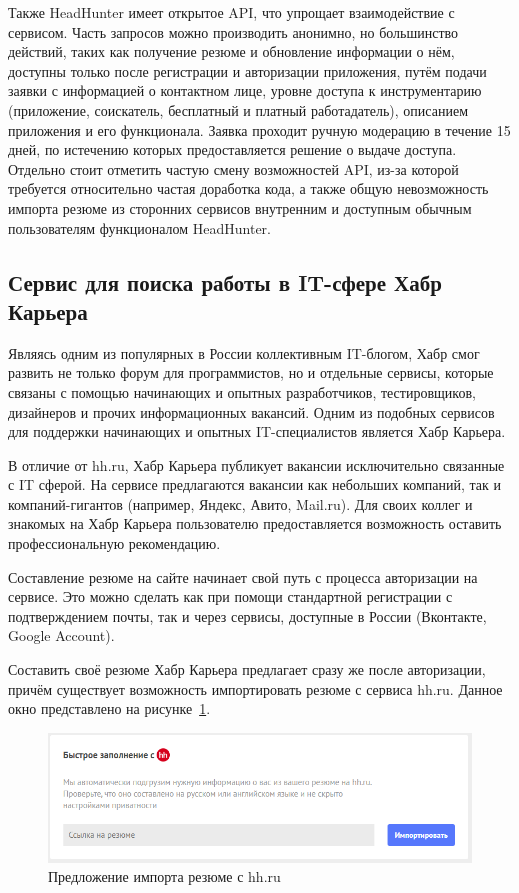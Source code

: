 \documentclass[master, och, diploma]{SCWorks}
\begin{document}
Также HeadHunter имеет открытое API, что упрощает взаимодействие с сервисом. Часть запросов можно производить анонимно, но большинство действий, таких как получение резюме и обновление информации о нём, доступны только после регистрации и авторизации приложения, путём подачи заявки с информацией о контактном лице, уровне доступа к инструментарию (приложение, соискатель, бесплатный и платный работадатель), описанием приложения и его функционала. Заявка проходит ручную модерацию в течение 15 дней, по истечению которых предоставляется решение о выдаче доступа. Отдельно стоит отметить частую смену возможностей API, из-за которой требуется относительно частая доработка кода, а также общую невозможность импорта резюме из сторонних сервисов внутренним и доступным обычным пользователям функционалом HeadHunter.



\subsection{Сервис для поиска работы в IT-сфере Хабр Карьера}
Являясь одним из популярных в России коллективным IT-блогом, Хабр смог развить не только форум для программистов, но и отдельные сервисы, которые связаны с помощью начинающих и опытных разработчиков, тестировщиков, дизайнеров и прочих информационных вакансий. Одним из подобных сервисов для поддержки начинающих и опытных IT-специалистов является Хабр Карьера\cite{Gridneva_2021}.

В отличие от hh.ru, Хабр Карьера публикует вакансии исключительно связанные с IT сферой. На сервисе предлагаются вакансии как небольших компаний, так и компаний-гигантов (например, Яндекс, Авито, Mail.ru). Для своих коллег и знакомых на Хабр Карьера пользователю предоставляется возможность оставить профессиональную рекомендацию.

Составление резюме на сайте начинает свой путь с процесса авторизации на сервисе. Это можно сделать как при помощи стандартной регистрации с подтверждением почты, так и через сервисы, доступные в России (Вконтакте, Google Account).

Составить своё резюме Хабр Карьера предлагает сразу же после авторизации, причём существует возможность импортировать резюме с сервиса hh.ru. Данное окно представлено на рисунке~\ref{fig:5}.
\begin{figure}[!ht]
    \centering
    \includegraphics[width=12cm]{images/image9.png}
    \caption{\label{fig:5}%
        Предложение импорта резюме с hh.ru}
\end{figure}
\end{document}
